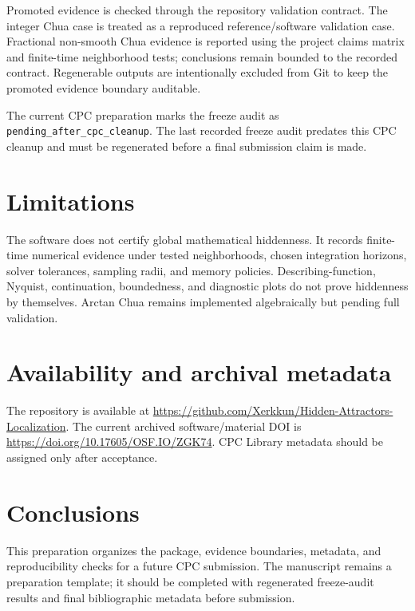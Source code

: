 \documentclass[preprint,12pt]{elsarticle}
\begin{document}
Promoted evidence is checked through the repository validation contract. The integer Chua case is treated as a reproduced reference/software validation case. Fractional non-smooth Chua evidence is reported using the project claims matrix and finite-time neighborhood tests; conclusions remain bounded to the recorded contract. Regenerable outputs are intentionally excluded from Git to keep the promoted evidence boundary auditable.

The current CPC preparation marks the freeze audit as \texttt{pending\_after\_cpc\_cleanup}. The last recorded freeze audit predates this CPC cleanup and must be regenerated before a final submission claim is made.

\section{Limitations}

The software does not certify global mathematical hiddenness. It records finite-time numerical evidence under tested neighborhoods, chosen integration horizons, solver tolerances, sampling radii, and memory policies. Describing-function, Nyquist, continuation, boundedness, and diagnostic plots do not prove hiddenness by themselves. Arctan Chua remains implemented algebraically but pending full validation.

\section{Availability and archival metadata}

The repository is available at \url{https://github.com/Xerkkun/Hidden-Attractors-Localization}. The current archived software/material DOI is \url{https://doi.org/10.17605/OSF.IO/ZGK74}. CPC Library metadata should be assigned only after acceptance.

\section{Conclusions}

This preparation organizes the package, evidence boundaries, metadata, and reproducibility checks for a future CPC submission. The manuscript remains a preparation template; it should be completed with regenerated freeze-audit results and final bibliographic metadata before submission.



\end{document}

